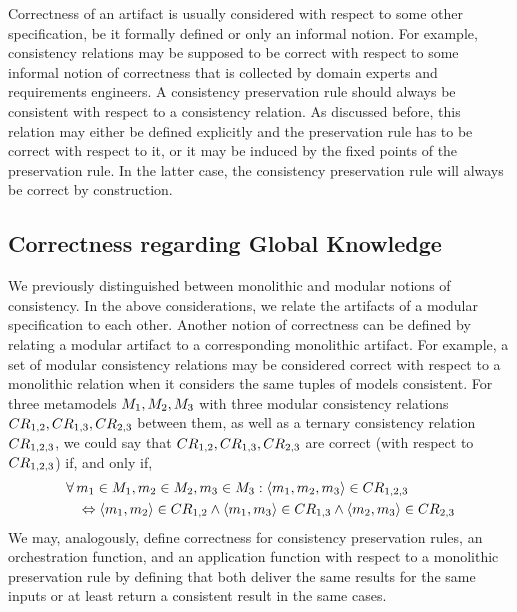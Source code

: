 Correctness of an artifact is usually considered with respect to some other specification, be it formally defined or only an informal notion.
For example, consistency relations may be supposed to be correct with respect to some informal notion of correctness that is collected by domain experts and requirements engineers.
A consistency preservation rule should always be consistent with respect to a consistency relation. As discussed before, this relation may either be defined explicitly and the preservation rule has to be correct with respect to it, or it may be induced by the fixed points of the preservation rule.
In the latter case, the consistency preservation rule will always be correct by construction.


\subsection{Correctness regarding Global Knowledge}

We previously distinguished between monolithic and modular notions of consistency.
In the above considerations, we relate the artifacts of a modular %
specification to each other.
Another notion of correctness can be defined by relating a modular artifact to a corresponding monolithic artifact.
For example, a set of modular consistency relations may be considered correct with respect to a monolithic relation when it considers the same tuples of models consistent.
For three metamodels $\metamodel{M}{1}, \metamodel{M}{2}, \metamodel{M}{3}$ with three modular consistency relations $\consistencyrelation{CR}{1,2}, \consistencyrelation{CR}{1,3}, \consistencyrelation{CR}{2,3}$ between them, as well as a ternary consistency relation $\consistencyrelation{CR}{1,2,3}$, we could say that $\consistencyrelation{CR}{1,2}, \consistencyrelation{CR}{1,3}, \consistencyrelation{CR}{2,3}$ are correct (with respect to $\consistencyrelation{CR}{1,2,3}$) if, and only if,
\begin{align*}
    & \forall \model{m}{1} \in \metamodel{M}{1}, \model{m}{2} \in \metamodel{M}{2}, \model{m}{3} \in \metamodel{M}{3}: \tupled{\model{m}{1}, \model{m}{2}, \model{m}{3}} \in \consistencyrelation{CR}{1,2,3} \\
    & \formulaskip
    \equivalent \tupled{\model{m}{1}, \model{m}{2}} \in \consistencyrelation{CR}{1,2} \land \tupled{\model{m}{1}, \model{m}{3}} \in \consistencyrelation{CR}{1,3} \land \tupled{\model{m}{2}, \model{m}{3}} \in \consistencyrelation{CR}{2,3}
\end{align*}
%
We may, analogously, define correctness for consistency preservation rules, an orchestration function, and an application function with respect to a monolithic preservation rule by defining that both deliver the same results for the same inputs or at least return a consistent result in the same cases.

